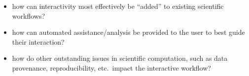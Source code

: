 \documentclass[a4paper,fontsize=12pt]{scrartcl}
\begin{document}
\begin{itemize}
\item how can interactivity most effectively be ``added'' to existing
  scientific workflows?
\item how can automated assistance/analysis be provided to the user to
  best guide their interaction?
\item how do other outstanding issues in scientific computation, such
  as data provenance, reproducibility, etc.~impact the interactive
  workflow?
\end{itemize}
\end{document}
